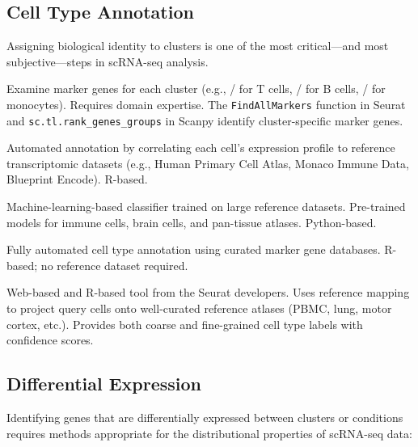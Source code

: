 \subsection{Cell Type Annotation}

Assigning biological identity to clusters is one of the most critical---and
most subjective---steps in scRNA-seq analysis.

\begin{description}[style=nextline]
  \item[Manual annotation] Examine marker genes for each cluster (e.g.,
    / for T cells, / for B
    cells, / for monocytes). Requires domain expertise.
    The \texttt{FindAllMarkers} function in Seurat and
    \texttt{sc.tl.rank\_genes\_groups} in Scanpy identify cluster-specific
    marker genes.
  \item[\software{SingleR}] Automated annotation by correlating each cell's
    expression profile to reference transcriptomic datasets (e.g., Human Primary
    Cell Atlas, Monaco Immune Data, Blueprint Encode). R-based.
  \item[\software{CellTypist}] Machine-learning-based classifier trained on
    large reference datasets. Pre-trained models for immune cells, brain cells,
    and pan-tissue atlases. Python-based.
  \item[\software{scType}] Fully automated cell type annotation using
    curated marker gene databases. R-based; no reference dataset required.
  \item[\software{Azimuth}] Web-based and R-based tool from the Seurat
    developers. Uses reference mapping to project query cells onto well-curated
    reference atlases (PBMC, lung, motor cortex, etc.). Provides both coarse
    and fine-grained cell type labels with confidence scores.
\end{description}

\subsection{Differential Expression}

Identifying genes that are differentially expressed between clusters or
conditions requires methods appropriate for the distributional properties of
scRNA-seq data:

